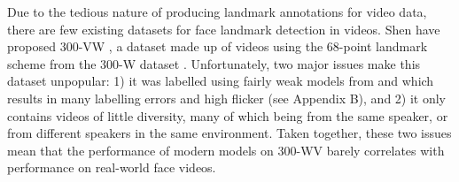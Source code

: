 \documentclass[10pt,twocolumn,letterpaper]{article}
\begin{document}
Due to the tedious nature of producing landmark annotations for video data, there are few existing datasets for face landmark detection in videos. Shen \etal have proposed 300-VW \cite{Shen2015FirstFacialLandmarkTracking}, a dataset made up of  videos using the 68-point landmark scheme from the 300-W dataset \cite{Sagonas2013Dataset300W}. Unfortunately, two major issues make this dataset unpopular: 1) it was labelled using fairly weak models from \cite{Chrysos2015DeformableFaceTracking} and \cite{Tzimiropoulos2015ProjectOutCascadedRegression} which results in many labelling errors and high flicker (see Appendix B), and 2) it only contains  videos of little diversity, many of which being from the same speaker, or from different speakers in the same environment. Taken together, these two issues mean that the performance of modern models on 300-WV barely correlates with performance on real-world face videos.
\end{document}
